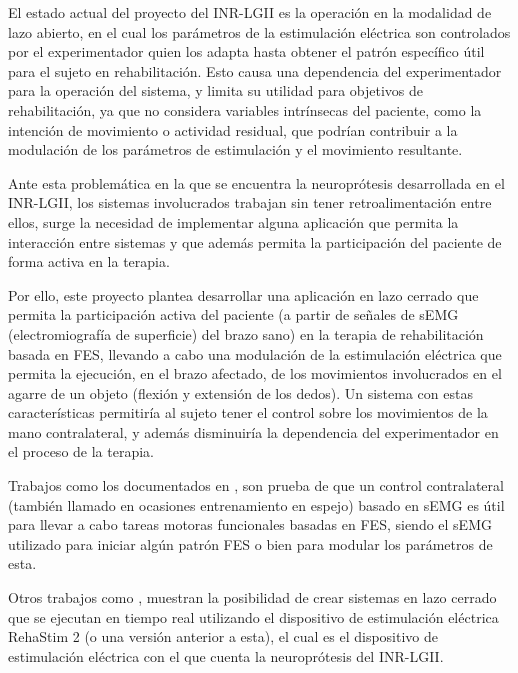 El estado actual del proyecto del INR-LGII es la  operación en la modalidad de lazo abierto, en el cual los parámetros de la estimulación eléctrica son controlados por el experimentador quien los adapta hasta obtener el patrón específico útil para el sujeto en rehabilitación. Esto causa una dependencia del experimentador para la operación del sistema, y limita su utilidad para objetivos de rehabilitación, ya que no considera variables intrínsecas del paciente, como la intención de movimiento o actividad residual, que podrían contribuir a la modulación de los parámetros de estimulación y el movimiento resultante.

Ante esta problemática en la que se encuentra la neuroprótesis desarrollada en el INR-LGII, los sistemas involucrados trabajan sin tener retroalimentación entre ellos, surge la necesidad de implementar alguna aplicación que permita la interacción entre sistemas y que además permita la participación del paciente de forma activa en la terapia.

Por ello, este proyecto plantea desarrollar una aplicación en lazo cerrado que permita la participación activa del paciente (a partir de señales de sEMG (electromiografía de superficie) del brazo sano) en la terapia de rehabilitación basada en FES, llevando a cabo una modulación de la estimulación eléctrica que permita la ejecución, en el brazo afectado, de los movimientos involucrados en el agarre de un objeto (flexión y extensión de los dedos). Un sistema con estas características permitiría al sujeto tener el control sobre los movimientos de la mano contralateral, y además disminuiría la dependencia del experimentador en el proceso de la terapia.

Trabajos como los documentados en \cite{Zhou2018} \cite{Kim2015} \cite{Yi2013} \cite{Fonseca2019}, son prueba de que un control contralateral (también llamado en ocasiones entrenamiento en espejo) basado en sEMG es útil para llevar a cabo tareas motoras funcionales basadas en FES, siendo el sEMG utilizado para iniciar algún patrón FES o bien para modular los parámetros de esta.

Otros trabajos como \cite{Salchow2016} \cite{Sun2014} \cite{Woods2018}, muestran la posibilidad de crear sistemas en lazo cerrado que se ejecutan en tiempo real utilizando el dispositivo de estimulación eléctrica RehaStim 2 (o una versión anterior a esta), el cual es el dispositivo de estimulación eléctrica con el que cuenta la neuroprótesis del INR-LGII.

